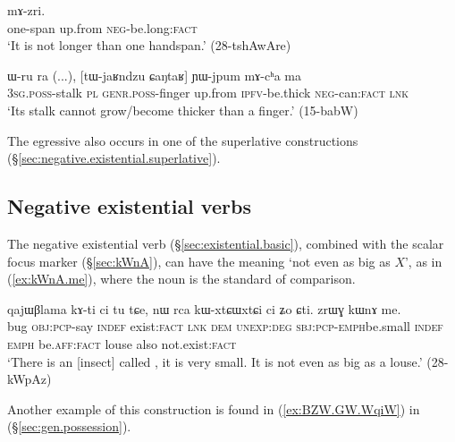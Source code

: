 \begin{exe}
\ex \label{ex:CaNtaR.mAzri}
  mɤ-zri. \\
 one-span up.from \textsc{neg}-be.long:\textsc{fact} \\
 \glt `It is not longer than one handspan.' (28-tshAwAre)
 \end{exe}

\begin{exe}
\ex \label{ex:CaNtaR.YWjpum.mAcha}
 \gll ɯ-ru ra (...), [tɯ-jaʁndzu ɕaŋtaʁ] ɲɯ-jpum mɤ-cʰa ma \\
 \textsc{3sg}.\textsc{poss}-stalk \textsc{pl} {  } \textsc{genr}.\textsc{poss}-finger up.from \textsc{ipfv}-be.thick \textsc{neg}-can:\textsc{fact} \textsc{lnk} \\
 \glt `Its stalk cannot grow/become thicker than a finger.' (15-babW)
 \end{exe}

The egressive  also occurs in one of the superlative constructions (§\ref{sec:negative.existential.superlative}).

\subsection{Negative existential verbs} \label{sec:existential.comparative}
The negative existential verb  (§\ref{sec:existential.basic}), combined with the scalar focus marker  (§\ref{sec:kWnA}), can have the meaning `not even as big as $X$', as in (\ref{ex:kWnA.me}), where the noun 
 is the standard of comparison.

\begin{exe}
\ex \label{ex:kWnA.me}
\gll qajɯβlama kɤ-ti ci tu tɕe, nɯ rca kɯ-xtɕɯ\redp{}xtɕi ci ʑo ɕti. zrɯɣ kɯnɤ me. \\
bug \textsc{obj}:\textsc{pcp}-say \textsc{indef} exist:\textsc{fact} \textsc{lnk} \textsc{dem} \textsc{unexp}:\textsc{deg} \textsc{sbj}:\textsc{pcp}-\textsc{emph}\redp{}be.small \textsc{indef} \textsc{emph} be.\textsc{aff}:\textsc{fact} louse also not.exist:\textsc{fact} \\
\glt `There is an [insect] called , it is very small. It is not even as big as a louse.' (28-kWpAz)
\end{exe}
 
Another example of this construction is found in (\ref{ex:BZW.GW.WqiW}) in (§\ref{sec:gen.possession}).

